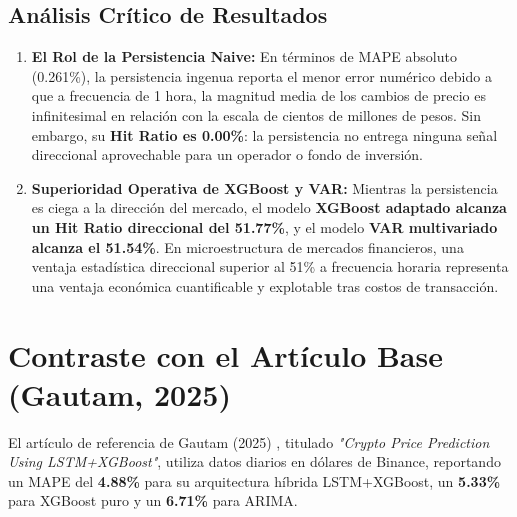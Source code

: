 \documentclass[12pt,letterpaper]{article}
\begin{document}
\subsection{Análisis Crítico de Resultados}
\begin{enumerate}
    \item \textbf{El Rol de la Persistencia Naive:} En términos de MAPE absoluto (0.261\%), la persistencia ingenua reporta el menor error numérico debido a que a frecuencia de 1 hora, la magnitud media de los cambios de precio es infinitesimal en relación con la escala de cientos de millones de pesos. Sin embargo, su \textbf{Hit Ratio es 0.00\%}: la persistencia no entrega ninguna señal direccional aprovechable para un operador o fondo de inversión.
    \item \textbf{Superioridad Operativa de XGBoost y VAR:} Mientras la persistencia es ciega a la dirección del mercado, el modelo \textbf{XGBoost adaptado alcanza un Hit Ratio direccional del 51.77\%}, y el modelo \textbf{VAR multivariado alcanza el 51.54\%}. En microestructura de mercados financieros, una ventaja estadística direccional superior al 51\% a frecuencia horaria representa una ventaja económica cuantificable y explotable tras costos de transacción.
\end{enumerate}

\section{Contraste con el Artículo Base (Gautam, 2025)}

El artículo de referencia de Gautam (2025) \cite{gautam2025crypto}, titulado \textit{"Crypto Price Prediction Using LSTM+XGBoost"}, utiliza datos diarios en dólares de Binance, reportando un MAPE del \textbf{4.88\%} para su arquitectura híbrida LSTM+XGBoost, un \textbf{5.33\%} para XGBoost puro y un \textbf{6.71\%} para ARIMA.
\end{document}
